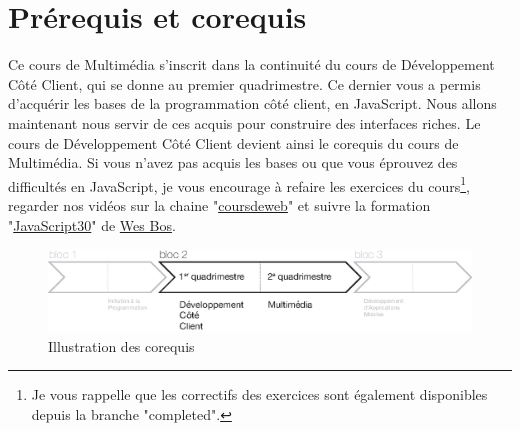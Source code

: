 \section{Prérequis et corequis}
Ce cours de Multimédia s’inscrit dans la continuité du cours de Développement Côté Client, qui se donne au premier quadrimestre. Ce dernier vous a permis d’acquérir les bases de la programmation côté client, en JavaScript. Nous allons maintenant nous servir de ces acquis pour construire des interfaces riches. Le cours de Développement Côté Client devient ainsi le corequis du cours de Multimédia.
Si vous n’avez pas acquis les bases ou que vous éprouvez des difficultés en JavaScript, je vous encourage à refaire les exercices du cours\footnote{Je vous rappelle que les correctifs des exercices sont également disponibles depuis la branche "completed".}, regarder nos vidéos sur la chaine "\href{https://www.youtube.com/@coursdeweb}{coursdeweb}" et suivre la formation "\href{https://javascript30.com}{JavaScript30}" de \href{https://wesbos.com}{Wes Bos}.

\begin{figure}[H]
    \begin{center}
        \includegraphics[width=\textwidth]{figures/corequis.eps}
        \caption{Illustration des corequis}
        \label{Fig:GQM}
    \end{center}
\end{figure}
\clearpage

